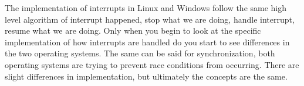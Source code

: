 \documentclass[10pt,serif,draftclsnofoot,onecolumn]{IEEEtran}
\begin{document}
	\newline
	\par
			The implementation of interrupts in Linux and Windows follow the same high level algorithm of interrupt happened, stop what we are doing, handle interrupt, resume what we are doing. Only when you begin to look at the specific implementation of how interrupts are handled do you start to see differences in the two operating systems. The same can be said for synchronization, both operating systems are trying to prevent race conditions from occurring. There are slight differences in implementation, but ultimately the concepts are the same. 
	\newpage


	
	
\end{document}
